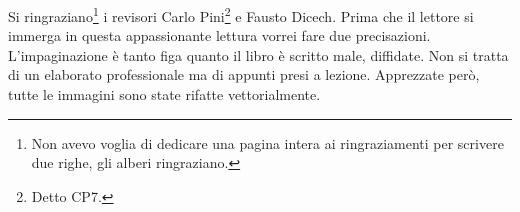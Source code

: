 %
%
%

\preface
Si ringraziano\footnote{Non avevo voglia di dedicare una pagina intera ai ringraziamenti per scrivere due righe, gli alberi ringraziano.} i revisori Carlo Pini\footnote{Detto CP7.} e Fausto Dicech. Prima che il lettore si immerga in questa appassionante lettura vorrei fare due precisazioni. L'impaginazione è tanto figa quanto il libro è scritto male, diffidate. Non si tratta di un elaborato professionale ma di appunti presi a lezione. Apprezzate però, tutte le immagini sono state rifatte vettorialmente. 

